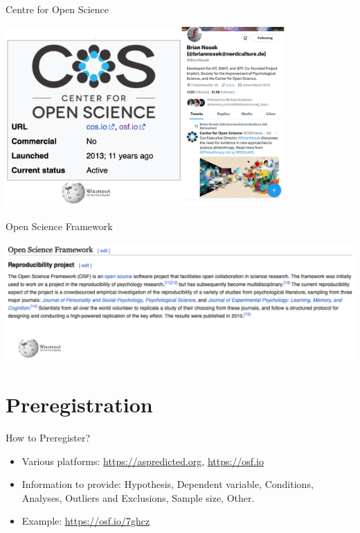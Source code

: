\documentclass[
  ignorenonframetext,
  aspectratio=169,
]{beamer}
\providecommand{\tightlist}{%
  \setlength{\itemsep}{0pt}\setlength{\parskip}{0pt}}\usepackage{longtable,booktabs,array}
\begin{document}
\begin{frame}{Centre for Open Science}
\label{centre-for-open-science}
\begin{center}
\includegraphics[width=0.8\textwidth,height=\textheight]{figs/cos.png}
\end{center}
\end{frame}

\begin{frame}{Open Science Framework}
\label{open-science-framework}
\begin{center}
\includegraphics{figs/osf.png}
\end{center}
\end{frame}

\section{Preregistration}\label{preregistration-1}

\begin{frame}{How to Preregister?}
\label{how-to-preregister}
\begin{itemize}
\tightlist
\item
  Various platforms: \url{https://aspredicted.org}, \url{https://osf.io}
\item
  Information to provide: Hypothesis, Dependent variable, Conditions,
  Analyses, Outliers and Exclusions, Sample size, Other.
\item
  Example: \url{https://osf.io/7ghcz}
\end{itemize}
\end{frame}
\end{document}
